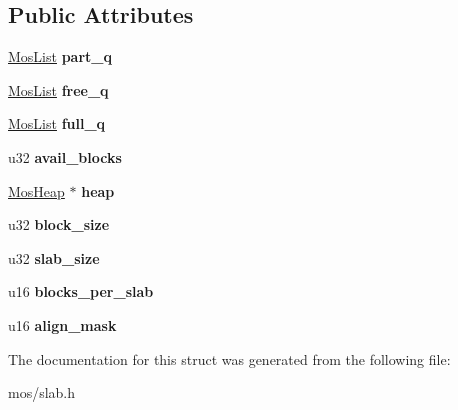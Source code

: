 \subsection*{Public Attributes}
\begin{DoxyCompactItemize}
\item 
\mbox{\label{structMosPool_a35db29268defbf37eda8afe57329c436}} 
\hyperlink{structMosList}{Mos\+List} {\bfseries part\+\_\+q}
\item 
\mbox{\label{structMosPool_a52a4ef587c709e67243c2887437746f1}} 
\hyperlink{structMosList}{Mos\+List} {\bfseries free\+\_\+q}
\item 
\mbox{\label{structMosPool_a9c32ebd7f6832de03a02444f1025a394}} 
\hyperlink{structMosList}{Mos\+List} {\bfseries full\+\_\+q}
\item 
\mbox{\label{structMosPool_a1f328c700c820e2548dc31637b8477bd}} 
u32 {\bfseries avail\+\_\+blocks}
\item 
\mbox{\label{structMosPool_ae8841c31465ac338c6092b8dca0ad6b3}} 
\hyperlink{structMosHeap}{Mos\+Heap} $\ast$ {\bfseries heap}
\item 
\mbox{\label{structMosPool_a0a5cec50ee6557c09685c76dd53f5db5}} 
u32 {\bfseries block\+\_\+size}
\item 
\mbox{\label{structMosPool_a257658d677e4c7f0040c536a1d89c10a}} 
u32 {\bfseries slab\+\_\+size}
\item 
\mbox{\label{structMosPool_ae3a072bf533eb64dcaaaa91f872dc7bb}} 
u16 {\bfseries blocks\+\_\+per\+\_\+slab}
\item 
\mbox{\label{structMosPool_a7def7c710420c4c753aa3b39bb30df77}} 
u16 {\bfseries align\+\_\+mask}
\end{DoxyCompactItemize}


The documentation for this struct was generated from the following file\+:\begin{DoxyCompactItemize}
\item 
mos/slab.\+h\end{DoxyCompactItemize}
